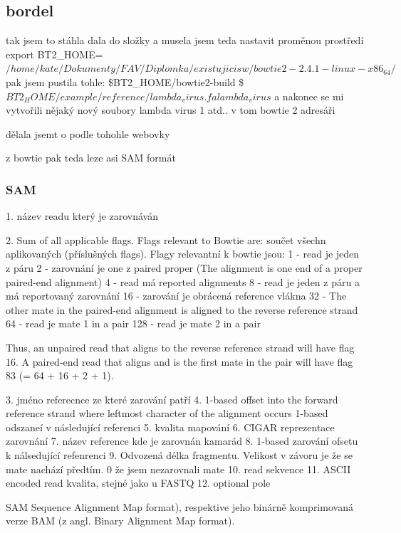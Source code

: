 \documentclass[czech,DP]{thesiskiv}
\numberwithin{equation}{section}
\begin{document}
\subsection{bordel}
tak jsem  to stáhla dala do složky a musela jsem teda nastavit proměnou prostředí 
export BT2\_HOME=$/home/kate/Dokumenty/FAV/Diplomka/existujicisw/bowtie2-2.4.1-linux-x86_64/$
pak jsem pustila tohle: 
\$BT2\_HOME/bowtie2-build \$ $BT2_HOME/example/reference/lambda_virus.fa lambda_virus$
a nakonec se mi vytvořili nějaký nový soubory lambda virus 1 atd.. v tom bowtie 2 adresáři

dělala jsemt o podle tohohle webovky %


z bowtie pak teda leze asi SAM formát


\subsubsection{SAM}
1. název readu který je zarovnáván

2. Sum of all applicable flags. Flags relevant to Bowtie are:
součet všechn aplikovaných (příslušných flags). Flagy relevantní k bowtie jsou: 
1 - read je jeden z páru
2 - zarovnání je one z paired proper (The alignment is one end of a proper paired-end alignment)
4 - read má reported alignments
8 - read je jeden z páru a má reportovaný zarovnání
16 - zarování je obrácená reference vlákna
32 - The other mate in the paired-end alignment is aligned to the reverse reference strand
64 - read je mate 1 in a pair
128 - read je mate 2 in a pair

Thus, an unpaired read that aligns to the reverse reference strand will have flag 16. A paired-end read that aligns and is the first mate in the pair will have flag 83 (= 64 + 16 + 2 + 1).

3. jméno referecnce ze které zarování patří
4. 1-based offset into the forward reference strand where leftmost character of the alignment occurs 1-based odszaneí v následující referenci 
5. kvalita mapování
6. CIGAR reprezentace zarovnání
7. název reference kde je zarovnán kamarád 
8. 1-based zarování ofsetu k nálsedující refenrenci 
9. Odvozená délka fragmentu. Velikost v závoru je že se mate nachází předtím. 0 že jsem nezarovnali mate
10. read sekvence
11. ASCII encoded read kvalita, stejné jako u FASTQ
12. optional pole


SAM Sequence Alignment Map format), respektive jeho binárně
komprimovaná verze BAM (z angl. Binary Alignment Map format).
\end{document}
